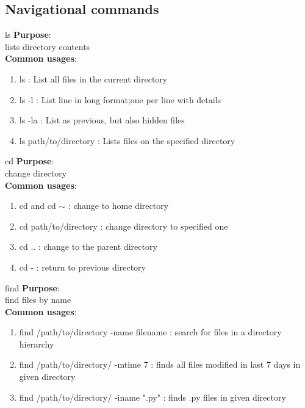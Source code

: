 \documentclass[11pt]{beamer}
\begin{document}
\subsection{Navigational commands}
\begin{frame}{ls}
\textbf{Purpose}:\\
\large lists directory contents \vspace{1cm}\pause \\
 
\textbf{Common usages}:\\
\begin{enumerate}
\item ls : List all files in the current directory
\item ls -l : List line in long format;one per line with details
\item ls -la : List as previous, but also hidden files
\item ls path/to/directory : Lists files on the specified directory
\end{enumerate}
\end{frame}

\begin{frame}{cd}
\textbf{Purpose}:\\
\large change directory \vspace{1cm}\pause \\
 
\textbf{Common usages}:\\
\begin{enumerate}
\item cd and cd $\scriptstyle\mathtt{\sim}$ : change to home directory
\item cd path/to/directory : change directory to specified one
\item cd .. : change to the parent directory 
\item cd - : return to previous directory
\end{enumerate}
\end{frame}

\begin{frame}{find}
\textbf{Purpose}:\\
\large find files by name \vspace{1cm}\pause \\
 
\textbf{Common usages}:\\
\begin{enumerate}
\item find /path/to/directory -name filename : search for files in a directory hierarchy
\item find /path/to/directory/ -mtime 7 : finds all files modified in last 7 days in given directory
\item find /path/to/directory/ -iname ".py" : finds .py files in given directory
\end{enumerate}
\end{frame}
\end{document}
